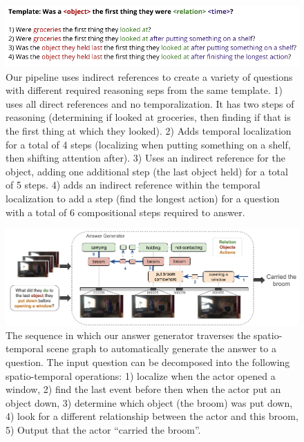 \documentclass[10pt,twocolumn,letterpaper]{article}
\begin{document}
    
\begin{figure}[t]
\begin{center}
\includegraphics[width=0.8\linewidth]{Figures/figure_indirect.png}
\end{center}
   \caption{Our pipeline uses indirect references to create a variety of questions with different required reasoning seps from the same template. 1) uses all direct references and no temporalization. It has two steps of reasoning (determining if looked at groceries, then finding if that is the first thing at which they looked). 2) Adds temporal localization for a total of 4 steps (localizing when putting something on a shelf, then shifting attention after). 3) Uses an indirect reference for the object, adding one additional step (the last object held) for a total of 5 steps. 4) adds an indirect reference within the temporal localization to add a step (find the longest action) for a question with a total of 6 compositional steps required to answer.}
\label{template_expansion}
\end{figure}

\begin{figure}[t]
\begin{center}
\includegraphics[width=0.8\linewidth]{Figures/figure_questionGenerator.png}
\end{center}
   \caption{The sequence in which our answer generator traverses the spatio-temporal scene graph to automatically generate the answer to a question. The input question can be decomposed into the following spatio-temporal operations: 
  1) localize when the actor opened a window, 
  2) find the last event before then when the actor put an object down, 
  3) determine which object (the broom) was put down, 
  4) look for a different relationship between the actor and this broom, 
  5) Output that the actor ``carried the broom''.}
\label{answer_generator}
\end{figure}
\end{document}
